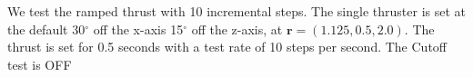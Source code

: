 We test the ramped thrust with 10 incremental steps. The single thruster is set at the default 30$^\circ$ off the x-axis 15$^\circ$ off the z-axis, at $\bm r = \left(1.125,0.5,2.0\right)$. The thrust is set for 0.5 seconds with a test rate of 10 steps per second. The Cutoff test is OFF